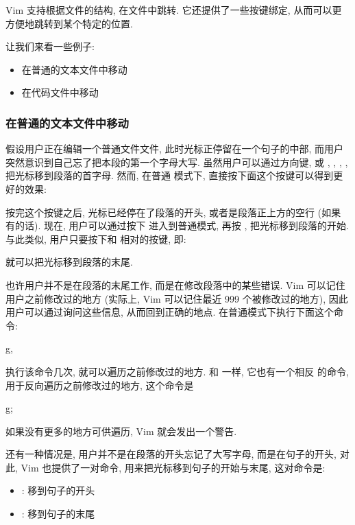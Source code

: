 Vim 支持根据文件的结构, 在文件中跳转. 它还提供了一些按键绑定, 从而可以更
方便地跳转到某个特定的位置.

让我们来看一些例子:
\begin{itemize}
    \item 在普通的文本文件中移动
    \item 在代码文件中移动
\end{itemize}

\subsubsection{在普通的文本文件中移动}
\label{subsubsec:moving_around_within_a_text_file}

假设用户正在编辑一个普通文件文件, 此时光标正停留在一个句子的中部, 而用户
突然意识到自己忘了把本段的第一个字母大写. 虽然用户可以通过方向键, 或
, , , , 把光标移到段落的首字母. 然而, 在普通 
模式下, 直接按下面这个按键可以得到更好的效果:
\begin{vimcmd}
{
\end{vimcmd}

按完这个按键之后, 光标已经停在了段落的开头, 或者是段落正上方的空行 (如果 
有的话). 现在, 用户可以通过按下  进入到普通模式, 再按 \key{\{},
把光标移到段落的开始. 与此类似, 用户只要按下和 \key{\{} 相对的按键, 即:
\begin{vimcmd}
}
\end{vimcmd}
就可以把光标移到段落的末尾.

也许用户并不是在段落的末尾工作, 而是在修改段落中的某些错误. Vim 可以记住
用户之前修改过的地方 (实际上, Vim 可以记住最近 999 个被修改过的地方), 因此
用户可以通过询问这些信息, 从而回到正确的地点. 在普通模式下执行下面这个命令:
\begin{vimcmd}
g,
\end{vimcmd}
执行该命令几次, 就可以遍历之前修改过的地方. 和 \key{\{} 一样, 它也有一个相反
的命令, 用于反向遍历之前修改过的地方, 这个命令是
\begin{vimcmd}
g;
\end{vimcmd}
如果没有更多的地方可供遍历, Vim 就会发出一个警告.

还有一种情况是, 用户并不是在段落的开头忘记了大写字母, 而是在句子的开头, 对此,
Vim 也提供了一对命令, 用来把光标移到句子的开始与末尾, 这对命令是:
\begin{itemize}
    \item \key{(}: 移到句子的开头
    \item \key{)}: 移到句子的末尾
\end{itemize}

